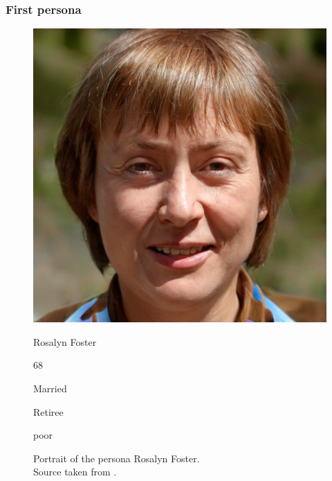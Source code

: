 \documentclass[conference]{IEEEtran}
\begin{document}
\subsubsection{First persona} \hfill
\begin{figure}[H]
	\centering
	\begin{minipage}{0.4\linewidth}
		\centerline{\includegraphics[width=\linewidth]{images/persona01.jpg}}
		\caption[Portrait of the persona Rosalyn Foster; Source taken from \cite{personaimg}.]
		{Portrait of the persona Rosalyn Foster.\\ Source taken from \cite{personaimg}.\endtabular}
		\label{fig:persona1}
	\end{minipage}
	\hfill
	\begin{minipage}{0.5\linewidth}
		\vspace{-25pt}
		\begin{description}[labelindent=-0.3cm]
			\item[Name] Rosalyn Foster
			\item[Age] 68
			\item[Marital status] Married
			\item[Occupation] Retiree
			\item[Computer skills] poor
		\end{description}
	\end{minipage}
\end{figure}
\end{document}
